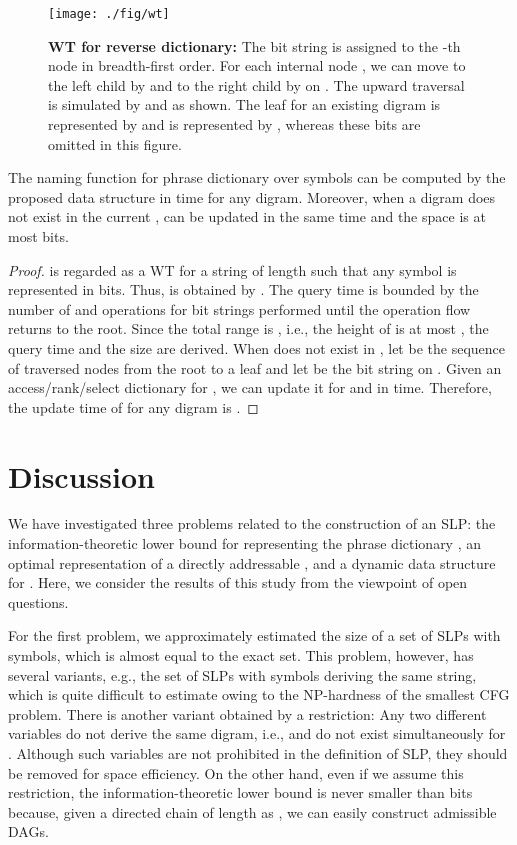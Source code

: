 \documentclass[10pt]{llncs}
\begin{document}
\begin{figure}[tb]
\begin{center}
\texttt{[image: ./fig/wt]}
\end{center}
\caption{
{\bf WT for reverse dictionary:}
The bit string  is assigned to 
the -th node in breadth-first order.
For each internal node ,
we can move to the left child by 
and to the right child by  on .
The upward traversal is simulated by 
and  as shown.
The leaf for an existing digram is represented by 
and  is represented by , whereas
these bits are omitted in this figure.
}
\label{wavelet_dic}
\end{figure}


\begin{theorem}\label{wavelet-th}
The naming function for phrase dictionary  over  
symbols can be computed by the proposed data structure 
in  time for any digram.
Moreover, when a digram does not exist in the current ,
 can be updated in the same time and 
the space is at most  bits.
\end{theorem}
\begin{proof}
 is regarded as a WT for 
a string  of length  such that any symbol is represented 
in  bits.
Thus,  is obtained by .
The query time is bounded by the number of
 and  operations for bit strings
performed until the operation flow returns to the root.
Since the total range is , i.e., the height of  is at most ,
the query time and the size are derived.
When  does not exist in ,
let  be the sequence of traversed nodes from the root  to
a leaf  and let  be the bit string on . 
Given an access/rank/select dictionary for ,
we can update it for  and  in  time.
Therefore, the update time of  for any digram is .
\hspace{\fill}
\end{proof}

\section{Discussion}

We have investigated three problems related to the construction of an SLP:
the information-theoretic lower bound for representing the phrase dictionary ,
an optimal representation of a directly addressable ,
and a dynamic data structure for .
Here, we consider the results of this study from the viewpoint of open questions.

For the first problem, we approximately estimated 
the size of a set of SLPs with  symbols, which is
almost equal to the exact set.
This problem, however, has several variants, e.g.,
the set of SLPs with  symbols deriving the same string,
which is quite difficult to estimate owing to the NP-hardness of the smallest CFG problem.
There is another variant obtained by a restriction:
Any two different variables do not derive the same digram, i.e.,
 and  do not exist simultaneously for .
Although such variables are not prohibited in the definition of SLP,
they should be removed for space efficiency.
On the other hand, even if we assume this restriction,
the information-theoretic lower bound is never smaller than  bits because, 
given a directed chain of length  as ,
we can easily construct  admissible DAGs.
\end{document}
